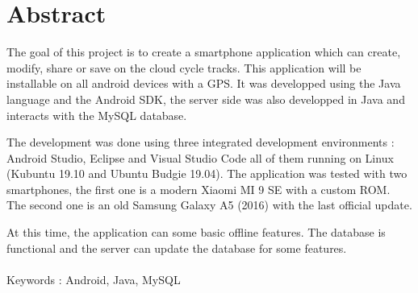 \documentclass[a4paper, 12pt]{report}
\begin{document}
\section{Abstract}
\indent
  The goal of this project is to create a smartphone application which can create, modify, share or save on the cloud cycle tracks. 
  This application will be installable on all android devices with a GPS. 
  It was developped using the Java language and the Android SDK, the server side was also developped in Java and interacts with the MySQL database.
  \\\par
  The development was done using three integrated development environments : Android Studio, Eclipse and Visual Studio Code all of them running on Linux (Kubuntu 19.10 and Ubuntu Budgie 19.04).
  The application was tested with two smartphones, the first one is a modern Xiaomi MI 9 SE with a custom ROM. The second one is an old Samsung Galaxy A5 (2016) with the last official update.
  \\\par
  At this time, the application can some basic offline features. The database is functional and the server can update the database for some features.
  \\\\
  Keywords : Android, Java, MySQL
\newpage
\tableofcontents
\newpage
{}

\newpage


\setcounter{secnumdepth}{2}





\setcounter{secnumdepth}{0}

\newpage
\end{document}
